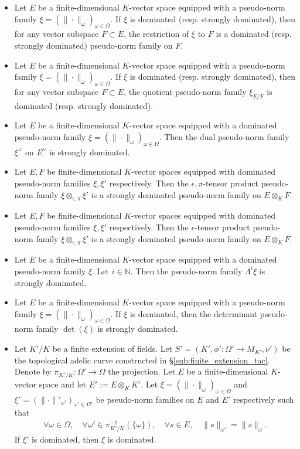 \documentclass [11pt,reqno]{amsart}
\def\bN{{\mathbb{N}}}
\newcommand{\1}{\mathmybb{1}}
\begin{document}
\begin{proposition}
\label{prop:constructions_dominated_semi-norm_families}
\begin{itemize}
	\item[(1)] Let $E$ be a finite-dimensional $K$-vector space equipped with a pseudo-norm family $\xi=(\|\cdot\|_{\omega})_{\omega\in\Omega}$.  If $\xi$ is dominated (resp. strongly dominated), then for any vector subspace $F\subset E$, the restriction of $\xi$ to $F$ is a dominated (resp. strongly dominated) pseudo-norm family on $F$.
	\item[(2)] Let $E$ be a finite-dimensional $K$-vector space equipped with a pseudo-norm family $\xi=(\|\cdot\|_{\omega})_{\omega\in\Omega}$.  If $\xi$ is dominated (resp. strongly dominated), then for any vector subspace $F\subset E$, the quotient pseudo-norm family $\xi_{E/F}$ is dominated (resp. strongly dominated).
	\item[(3)] Let $E$ be a finite-dimensional $K$-vector space equipped with a dominated pseudo-norm family $\xi=(\|\cdot\|_{\omega})_{\omega\in\Omega}$.  Then the dual pseudo-norm family $\xi^{\vee}$ on $E^{\vee}$ is strongly dominated.
	\item[(4.a)] Let $E,F$ be finite-dimensional $K$-vector spaces equipped with dominated pseudo-norm families $\xi,\xi'$ respectively. Then the $\epsilon,\pi$-tensor product pseudo-norm family $\xi \otimes_{\epsilon,\pi} \xi'$ is a strongly dominated pseudo-norm family on $E\otimes_K F$.
	\item[(4.b)] Let $E,F$ be finite-dimensional $K$-vector spaces equipped with dominated pseudo-norm families $\xi,\xi'$ respectively. Then the $\epsilon$-tensor product pseudo-norm family $\xi \otimes_{\epsilon,\pi} \xi'$ is a strongly dominated pseudo-norm family on $E\otimes_K F$.
	\item[(5)] Let $E$ be a finite-dimensional $K$-vector space equipped with a dominated pseudo-norm family $\xi$. Let $i\in \bN$. Then the pseudo-norm family $\Lambda^i \xi$ is strongly dominated. 
	\item[(6)] Let $E$ be a finite-dimensional $K$-vector space equipped with a pseudo-norm family $\xi=(\|\cdot\|_{\omega})_{\omega\in\Omega}$. If $\xi$ is dominated, then the determinant pseudo-norm family $\det(\xi)$ is strongly dominated.
	\item[(7)] Let $K'/K$ be a finite extension of fields. Let $S'=(K',\phi' : \Omega' \to M_{K'},\nu')$ be the topological adelic curve constructed in \S \ref{sub:finite_extension_tac}. Denote by $\pi_{K'/K} : \Omega' \to \Omega$ the projection. Let $E$ be a finite-dimensional $K$-vector space and let $E' := E \otimes_{K} K'$. Let $\xi=(\|\cdot\|_{\omega})_{\omega\in\Omega}$ and $\xi'=(\|\cdot\|'_{\omega'})_{\omega'\in\Omega'}$ be pseudo-norm families on $E$ and $E'$ respectively such that
	\begin{align*}
	\forall \omega\in \Omega,\quad \forall \omega'\in \pi_{K'/K}^{-1}(\{\omega\}),\quad \forall s\in E,\quad \|s\|_{\omega'}=\|s\|_{\omega}.
	\end{align*}
	If $\xi'$ is dominated, then $\xi$ is dominated.
\end{itemize}
\end{proposition}
\end{document}
